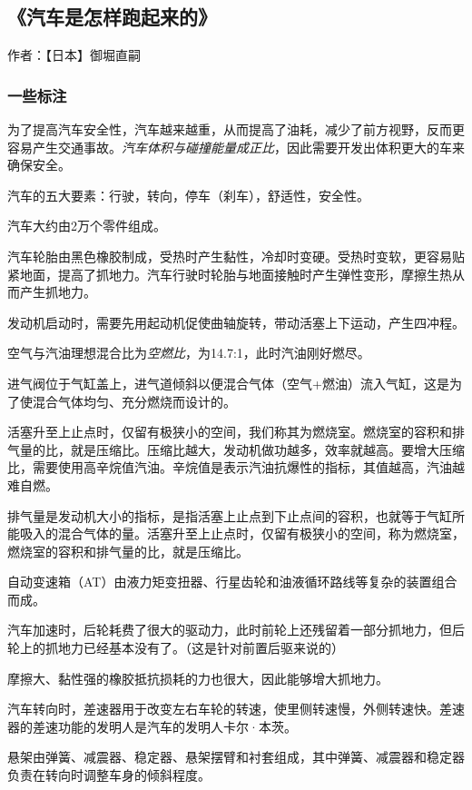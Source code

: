 \subsection{《汽车是怎样跑起来的》}

作者：【日本】御堀直嗣

\subsubsection{一些标注}

为了提高汽车安全性，汽车越来越重，从而提高了油耗，减少了前方视野，反而更容易产生交通事故。\emph{汽车体积与碰撞能量成正比}，因此需要开发出体积更大的车来确保安全。

汽车的五大要素：行驶，转向，停车（刹车），舒适性，安全性。

汽车大约由2万个零件组成。

汽车轮胎由黑色橡胶制成，受热时产生黏性，冷却时变硬。受热时变软，更容易贴紧地面，提高了抓地力。汽车行驶时轮胎与地面接触时产生弹性变形，摩擦生热从而产生抓地力。

发动机启动时，需要先用起动机促使曲轴旋转，带动活塞上下运动，产生四冲程。

空气与汽油理想混合比为\emph{空燃比}，为14.7:1，此时汽油刚好燃尽。

进气阀位于气缸盖上，进气道倾斜以便混合气体（空气+燃油）流入气缸，这是为了使混合气体均匀、充分燃烧而设计的。

活塞升至上止点时，仅留有极狭小的空间，我们称其为燃烧室。燃烧室的容积和排气量的比，就是压缩比。压缩比越大，发动机做功越多，效率就越高。要增大压缩比，需要使用高辛烷值汽油。辛烷值是表示汽油抗爆性的指标，其值越高，汽油越难自燃。

排气量是发动机大小的指标，是指活塞上止点到下止点间的容积，也就等于气缸所能吸入的混合气体的量。活塞升至上止点时，仅留有极狭小的空间，称为燃烧室，燃烧室的容积和排气量的比，就是压缩比。

自动变速箱（AT）由液力矩变扭器、行星齿轮和油液循环路线等复杂的装置组合而成。

汽车加速时，后轮耗费了很大的驱动力，此时前轮上还残留着一部分抓地力，但后轮上的抓地力已经基本没有了。（这是针对前置后驱来说的）

摩擦大、黏性强的橡胶抵抗损耗的力也很大，因此能够增大抓地力。

汽车转向时，差速器用于改变左右车轮的转速，使里侧转速慢，外侧转速快。差速器的差速功能的发明人是汽车的发明人卡尔·本茨。

悬架由弹簧、减震器、稳定器、悬架摆臂和衬套组成，其中弹簧、减震器和稳定器负责在转向时调整车身的倾斜程度。

